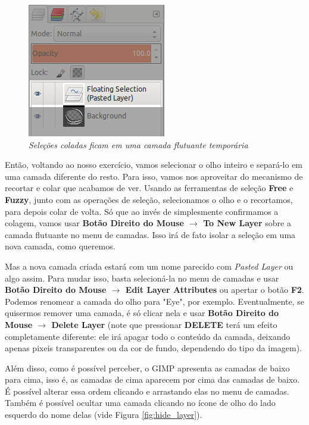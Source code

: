 \documentclass[12pt,onecolumn]{article}
\begin{document}
    \begin{figure}[H]
      \centering
      \includegraphics[width=.5\textwidth]{screenshots/05-pasted_layer.png}
      \caption{
        \footnotesize
        \it
        Seleções coladas ficam em uma camada flutuante temporária
      }
      \label{fig:pasted_layer}
    \end{figure}
    
    Então, voltando ao nosso exercício, vamos selecionar o olho inteiro e
    separá-lo em uma camada diferente do resto. Para isso, vamos nos aproveitar
    do mecanismo de recortar e colar que acabamos de ver. Usando as ferramentas
    de seleção {\bf Free} e {\bf Fuzzy}, junto com as operações de seleção,
    selecionamos o olho e o recortamos, para depois colar de volta. Só que ao
    invés de simplesmente confirmamos a colagem, vamos usar {\bf Botão Direito
    do Mouse $\rightarrow$ To New Layer} sobre a camada flutuante no menu de
    camadas. Isso irá de fato isolar a seleção em uma nova camada, como
    queremos.
    
    Mas a nova camada criada estará com um nome parecido com {\it Pasted Layer}
    ou algo assim. Para mudar isso, basta selecioná-la no menu de camadas e usar
    {\bf Botão Direito do Mouse $\rightarrow$ Edit Layer Attributes} ou apertar
    o botão {\bf F2}. Podemos renomear a camada do olho para "Eye", por exemplo.
    Eventualmente, se quisermos remover uma camada, é só clicar nela e usar
    {\bf Botão Direito do Mouse $\rightarrow$ Delete Layer} (note que pressionar
    {\bf DELETE} terá um efeito completamente diferente: ele irá apagar todo o
    conteúdo da camada, deixando apenas pixeis transparentes ou da cor de fundo,
    dependendo do tipo da imagem).
    
    Além disso, como é possível perceber, o GIMP apresenta as camadas de baixo
    para cima, isso é, as camadas de cima aparecem por cima das camadas de
    baixo. É possível alterar essa ordem clicando e arrastando elas no menu de
    camadas. Também é possível ocultar uma camada clicando no ícone de olho do
    lado esquerdo do nome delas (vide Figura \ref{fig:hide_layer}).
    
\end{document}

